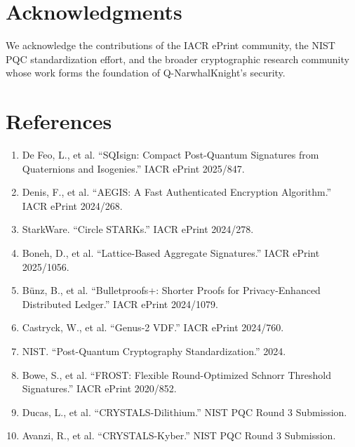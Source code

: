 \documentclass[11pt,a4paper]{article}
\begin{document}
\section*{Acknowledgments}

We acknowledge the contributions of the IACR ePrint community, the NIST PQC standardization effort, and the broader cryptographic research community whose work forms the foundation of Q-NarwhalKnight's security.

\section*{References}

\begin{enumerate}
    \item De Feo, L., et al. ``SQIsign: Compact Post-Quantum Signatures from Quaternions and Isogenies.'' IACR ePrint 2025/847.

    \item Denis, F., et al. ``AEGIS: A Fast Authenticated Encryption Algorithm.'' IACR ePrint 2024/268.

    \item StarkWare. ``Circle STARKs.'' IACR ePrint 2024/278.

    \item Boneh, D., et al. ``Lattice-Based Aggregate Signatures.'' IACR ePrint 2025/1056.

    \item Bünz, B., et al. ``Bulletproofs+: Shorter Proofs for Privacy-Enhanced Distributed Ledger.'' IACR ePrint 2024/1079.

    \item Castryck, W., et al. ``Genus-2 VDF.'' IACR ePrint 2024/760.

    \item NIST. ``Post-Quantum Cryptography Standardization.'' 2024.

    \item Bowe, S., et al. ``FROST: Flexible Round-Optimized Schnorr Threshold Signatures.'' IACR ePrint 2020/852.

    \item Ducas, L., et al. ``CRYSTALS-Dilithium.'' NIST PQC Round 3 Submission.

    \item Avanzi, R., et al. ``CRYSTALS-Kyber.'' NIST PQC Round 3 Submission.
\end{enumerate}
\end{document}
